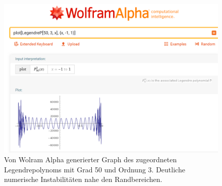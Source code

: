 \begin{figure}[!h]
\centering
\includegraphics[width=0.9\linewidth]{papers/legendre/plots/wolframalpha}
\caption{Von Wolram Alpha \cite{legendre:wolfram-alpha} generierter Graph des zugeordneten Legendrepolynoms mit Grad 50 und Ordnung 3. Deutliche numerische Instabilitäten nahe den Randbereichen.}
\label{legendre:fig:wolframalpha}
\end{figure}

